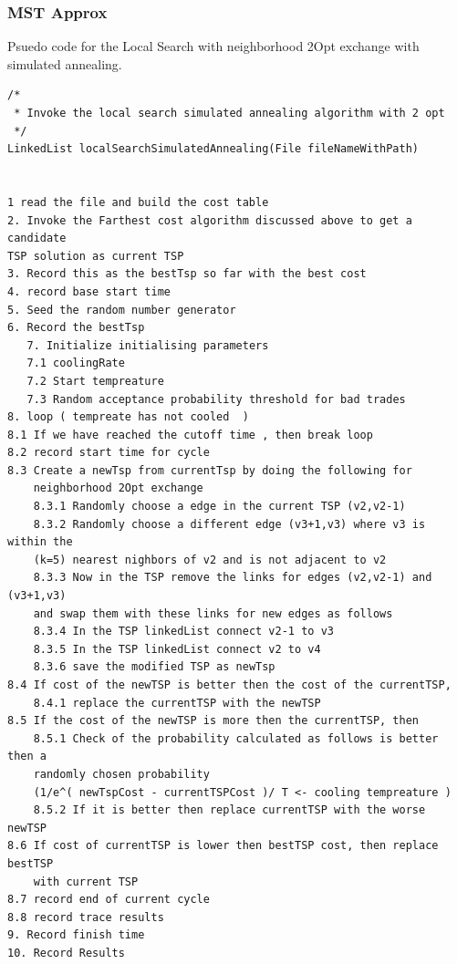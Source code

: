 \documentclass[twoside,11pt]{article}
\begin{document}
\subsubsection{MST Approx}
Psuedo code for the Local Search with neighborhood 2Opt exchange with simulated annealing.
\begin{lstlisting}
/*
 * Invoke the local search simulated annealing algorithm with 2 opt
 */
LinkedList localSearchSimulatedAnnealing(File fileNameWithPath) 
		
		
1 read the file and build the cost table
2. Invoke the Farthest cost algorithm discussed above to get a candidate 
TSP solution as current TSP
3. Record this as the bestTsp so far with the best cost
4. record base start time
5. Seed the random number generator
6. Record the bestTsp
   7. Initialize initialising parameters
   7.1 coolingRate
   7.2 Start tempreature
   7.3 Random acceptance probability threshold for bad trades
8. loop ( tempreate has not cooled  )
8.1 If we have reached the cutoff time , then break loop
8.2 record start time for cycle
8.3 Create a newTsp from currentTsp by doing the following for 
	neighborhood 2Opt exchange
	8.3.1 Randomly choose a edge in the current TSP (v2,v2-1)
	8.3.2 Randomly choose a different edge (v3+1,v3) where v3 is within the
	(k=5) nearest nighbors of v2 and is not adjacent to v2
	8.3.3 Now in the TSP remove the links for edges (v2,v2-1) and (v3+1,v3)
	and swap them with these links for new edges as follows
	8.3.4 In the TSP linkedList connect v2-1 to v3
	8.3.5 In the TSP linkedList connect v2 to v4
	8.3.6 save the modified TSP as newTsp 
8.4 If cost of the newTSP is better then the cost of the currentTSP, 
	8.4.1 replace the currentTSP with the newTSP
8.5 If the cost of the newTSP is more then the currentTSP, then 
	8.5.1 Check of the probability calculated as follows is better then a 
	randomly chosen probability
	(1/e^( newTspCost - currentTSPCost )/ T <- cooling tempreature )
	8.5.2 If it is better then replace currentTSP with the worse newTSP
8.6 If cost of currentTSP is lower then bestTSP cost, then replace bestTSP
	with current TSP
8.7 record end of current cycle
8.8 record trace results
9. Record finish time 
10. Record Results 	
\end{lstlisting}
\end{document}
